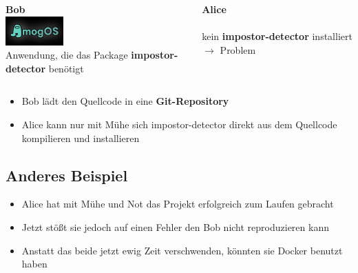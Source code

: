 \begin{frame}
    \slidehead
    \vspace{-1em}
    \Large
    \begin{columns}[c]
        \begin{column}{.5\textwidth}
            \centering
            \textbf{Bob} \\
            \vspace{0.5em}
            \includegraphics[height = 3em]{../pictures/amogos} \\
            Anwendung, die das Package \textbf{impostor-detector} benötigt
        \end{column}
        \begin{column}{.5\textwidth}
            \centering
            \textbf{Alice} \\
            \vspace{0.5em}
              \\
            kein \textbf{impostor-detector} installiert $\rightarrow$ Problem
        \end{column}
    \end{columns}
    \begin{itemize}[<+->]
        \item Bob lädt den Quellcode in eine \textbf{Git-Repository}
        \item Alice kann nur mit Mühe sich impostor-detector direkt aus dem Quellcode kompilieren und installieren
    \end{itemize}
\end{frame}

\subsection{Anderes Beispiel}
\begin{frame}
    \slidehead
    \vspace{-1em}
    \Large
    \begin{itemize}[<+->]
        \item Alice hat mit Mühe und Not das Projekt erfolgreich zum Laufen gebracht
        \item Jetzt stößt sie jedoch auf einen Fehler den Bob nicht reproduzieren kann
        \item Anstatt das beide jetzt ewig Zeit verschwenden, könnten sie Docker benutzt haben
    \end{itemize}
\end{frame}

